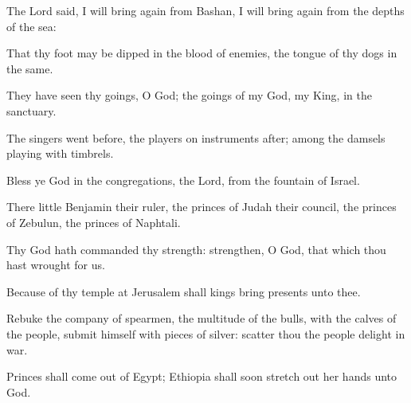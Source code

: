 {\Q {}The
Lord
said, I will bring
again from
Bashan, I will bring
{}
again from the
depths of the
sea:


\par }{\Q {}That thy
foot may be
dipped in the
blood of
{}
enemies,
{} the
tongue of thy
dogs in the same.


\par }{\Q {}They have
seen thy
goings, O
God;
{} the
goings of my
God, my
King, in the
sanctuary.


\par }{\Q {}The
singers went
before, the players on
instruments
{}
after;
among
{} the
damsels playing with
timbrels.


\par }{\Q {}Bless ye
God in the
congregations,
{} the
Lord, from the
fountain of
Israel.


\par }{\Q {}There
{}
little
Benjamin
{} their
ruler, the
princes of
Judah
{} their
council, the
princes of
Zebulun,
{} the
princes of
Naphtali.


\par }{\Q {}Thy
God hath
commanded thy
strength:
strengthen, O
God, that
which thou hast
wrought for us.


\par }{\Q {}Because of thy
temple at
Jerusalem shall
kings
bring
presents unto thee.


\par }{\Q {}Rebuke the
company of
spearmen, the
multitude of the
bulls, with the
calves of the
people,
{}
submit himself with
pieces of
silver:
scatter thou the
people
{}
delight in
war.


\par }{\Q {}Princes shall come
out of
Egypt;
Ethiopia shall soon stretch
out her
hands unto
God.


\par }{\BB \par }
